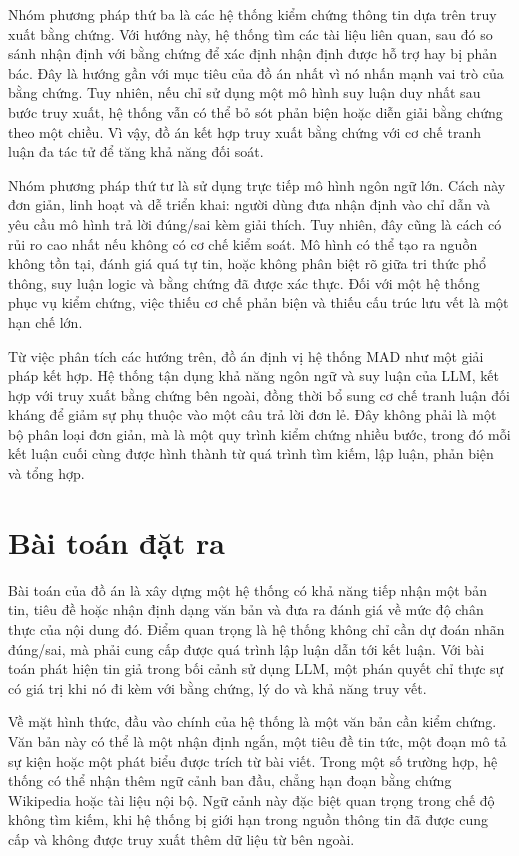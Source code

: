 ﻿\documentclass[oneside,a4paper,12pt]{extreport}
\begin{document}
Nhóm phương pháp thứ ba là các hệ thống kiểm chứng thông tin dựa trên truy xuất bằng chứng. Với hướng này, hệ thống tìm các tài liệu liên quan, sau đó so sánh nhận định với bằng chứng để xác định nhận định được hỗ trợ hay bị phản bác. Đây là hướng gần với mục tiêu của đồ án nhất vì nó nhấn mạnh vai trò của bằng chứng. Tuy nhiên, nếu chỉ sử dụng một mô hình suy luận duy nhất sau bước truy xuất, hệ thống vẫn có thể bỏ sót phản biện hoặc diễn giải bằng chứng theo một chiều. Vì vậy, đồ án kết hợp truy xuất bằng chứng với cơ chế tranh luận đa tác tử để tăng khả năng đối soát.

Nhóm phương pháp thứ tư là sử dụng trực tiếp mô hình ngôn ngữ lớn. Cách này đơn giản, linh hoạt và dễ triển khai: người dùng đưa nhận định vào chỉ dẫn và yêu cầu mô hình trả lời đúng/sai kèm giải thích. Tuy nhiên, đây cũng là cách có rủi ro cao nhất nếu không có cơ chế kiểm soát. Mô hình có thể tạo ra nguồn không tồn tại, đánh giá quá tự tin, hoặc không phân biệt rõ giữa tri thức phổ thông, suy luận logic và bằng chứng đã được xác thực. Đối với một hệ thống phục vụ kiểm chứng, việc thiếu cơ chế phản biện và thiếu cấu trúc lưu vết là một hạn chế lớn.

Từ việc phân tích các hướng trên, đồ án định vị hệ thống MAD như một giải pháp kết hợp. Hệ thống tận dụng khả năng ngôn ngữ và suy luận của LLM, kết hợp với truy xuất bằng chứng bên ngoài, đồng thời bổ sung cơ chế tranh luận đối kháng để giảm sự phụ thuộc vào một câu trả lời đơn lẻ. Đây không phải là một bộ phân loại đơn giản, mà là một quy trình kiểm chứng nhiều bước, trong đó mỗi kết luận cuối cùng được hình thành từ quá trình tìm kiếm, lập luận, phản biện và tổng hợp.

\section{Bài toán đặt ra}

Bài toán của đồ án là xây dựng một hệ thống có khả năng tiếp nhận một bản tin, tiêu đề hoặc nhận định dạng văn bản và đưa ra đánh giá về mức độ chân thực của nội dung đó. Điểm quan trọng là hệ thống không chỉ cần dự đoán nhãn đúng/sai, mà phải cung cấp được quá trình lập luận dẫn tới kết luận. Với bài toán phát hiện tin giả trong bối cảnh sử dụng LLM, một phán quyết chỉ thực sự có giá trị khi nó đi kèm với bằng chứng, lý do và khả năng truy vết.

Về mặt hình thức, đầu vào chính của hệ thống là một văn bản cần kiểm chứng. Văn bản này có thể là một nhận định ngắn, một tiêu đề tin tức, một đoạn mô tả sự kiện hoặc một phát biểu được trích từ bài viết. Trong một số trường hợp, hệ thống có thể nhận thêm ngữ cảnh ban đầu, chẳng hạn đoạn bằng chứng Wikipedia hoặc tài liệu nội bộ. Ngữ cảnh này đặc biệt quan trọng trong chế độ không tìm kiếm, khi hệ thống bị giới hạn trong nguồn thông tin đã được cung cấp và không được truy xuất thêm dữ liệu từ bên ngoài.
\end{document}
